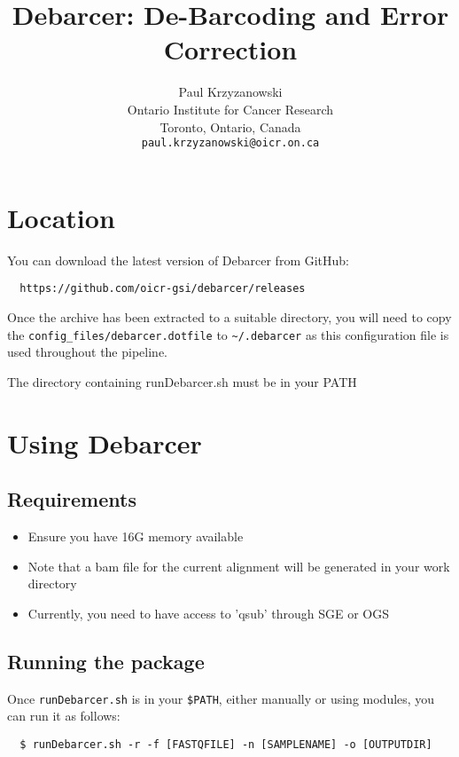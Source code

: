\documentclass{article}
\title{Debarcer: De-Barcoding and Error Correction}
\author{Paul Krzyzanowski\\
  Ontario Institute for Cancer Research\\
  Toronto, Ontario, Canada\\
  \texttt{paul.krzyzanowski@oicr.on.ca}}
\begin{document}
\maketitle


\section{Location}

	You can download the latest version of Debarcer from GitHub:

\begin{verbatim}
  https://github.com/oicr-gsi/debarcer/releases
\end{verbatim}

Once the archive has been extracted to a suitable directory, you
will need to copy the \texttt{config\_files/debarcer.dotfile} 
to \texttt{\~\//.debarcer} as 
this configuration file is used throughout the pipeline.


The directory containing runDebarcer.sh must be in your PATH

\section{Using Debarcer}

\subsection{Requirements}

\begin{itemize}
  \item Ensure you have 16G memory available
  \item Note that a bam file for the current alignment will be generated in your work directory
  \item Currently, you need to have access to 'qsub' through SGE or OGS
\end{itemize}

\subsection{Running the package}

Once \texttt{runDebarcer.sh} is in your \texttt{\$PATH}, either manually or using modules, you can run it as follows:

\begin{verbatim}
  $ runDebarcer.sh -r -f [FASTQFILE] -n [SAMPLENAME] -o [OUTPUTDIR]
\end{verbatim}
\end{document}
